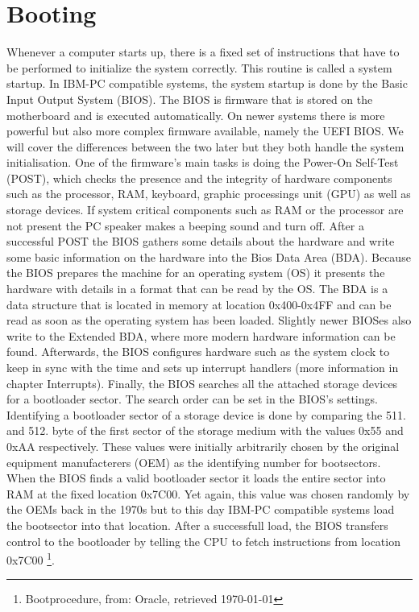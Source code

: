 \section{Booting}

Whenever a computer starts up, there is a fixed set of instructions that
have to be performed to initialize the system correctly. This routine is
called a system startup. In IBM-PC compatible systems, the system startup
is done by the Basic Input Output System (BIOS). The BIOS is firmware
that is stored on the motherboard and is executed automatically. On newer systems there is
more powerful but also more complex firmware available, namely the UEFI BIOS. We
will cover the differences between the two later but they both handle the
system initialisation. One of the firmware's main tasks is doing the Power-On
Self-Test (POST), which checks the presence and the
integrity of hardware components such as the processor, RAM, keyboard,
graphic processings unit (GPU) as well as storage devices. If system critical components such as 
RAM or the processor are not present the PC speaker makes a beeping sound
and turn off. After a successful POST the BIOS gathers some details
about the hardware and write some basic
information on the hardware into the Bios Data Area (BDA). Because the BIOS
prepares the machine for an operating system (OS) it presents the hardware with
details in a format that can be read by the OS.
The BDA is a data structure that is located in memory at location 0x400-0x4FF and
can be read as soon as the operating system has been loaded. Slightly newer BIOSes also
write to the Extended BDA, where more modern hardware information can be
found. Afterwards, the BIOS configures hardware such as the system clock
to keep in sync with the time and sets up interrupt handlers (more information in 
chapter Interrupts). Finally, the BIOS searches all the
attached storage devices for a bootloader sector. The search order can be
set in the BIOS's settings. Identifying a bootloader sector of a storage device is
done by comparing the 511. and 512. byte of the first sector of the storage medium
with the values 0x55 and 0xAA respectively. These values were initially
arbitrarily chosen by the original equipment manufacterers (OEM) as the 
identifying number for bootsectors. When the BIOS finds a valid
bootloader sector it loads the entire sector into RAM at the fixed
location 0x7C00. Yet again, this value was chosen randomly by the OEMs
back in the 1970s but to this day IBM-PC compatible systems load
the bootsector into that location. After a successfull load, the BIOS
transfers control to the bootloader by telling the CPU to fetch
instructions from location 0x7C00
\footnote{Bootprocedure, from: Oracle, retrieved \today}.


